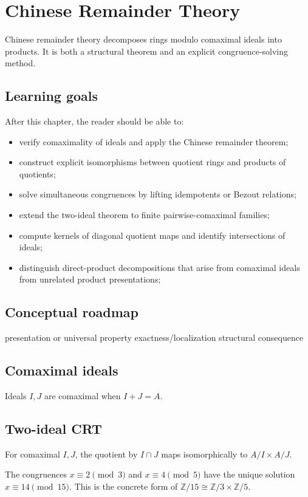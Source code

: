 \chapter{Chinese Remainder Theory}
\label{ch:v04}

Chinese remainder theory decomposes rings modulo comaximal ideals into products. It is both a structural theorem and an explicit congruence-solving method.

\section*{Learning goals}
After this chapter, the reader should be able to:
\begin{itemize}
\item verify comaximality of ideals and apply the Chinese remainder theorem;
\item construct explicit isomorphisms between quotient rings and products of quotients;
\item solve simultaneous congruences by lifting idempotents or Bezout relations;
\item extend the two-ideal theorem to finite pairwise-comaximal families;
\item compute kernels of diagonal quotient maps and identify intersections of ideals;
\item distinguish direct-product decompositions that arise from comaximal ideals from unrelated product presentations;
\end{itemize}
\section*{Conceptual roadmap}
\volroadmap
  {presentation or universal property}
  {exactness/localization}
  {structural consequence}

\section{Comaximal ideals}
Ideals $I,J$ are comaximal when $I+J=A$.

\section{Two-ideal CRT}
For comaximal $I,J$, the quotient by $I\cap J$ maps isomorphically to $A/I\times A/J$.

\begin{example}\label{ex:v04-expand-01}
The congruences $x\equiv2\pmod3$ and $x\equiv4\pmod5$ have the unique solution $x\equiv14\pmod{15}$. This is the concrete form of $\mathbb Z/15\cong\mathbb Z/3\times\mathbb Z/5$.
\end{example}
